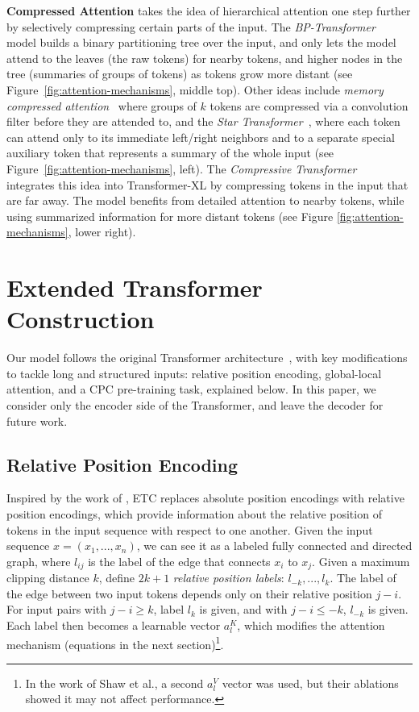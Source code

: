 \documentclass[11pt,a4paper]{article}
\begin{document}
{\bf Compressed Attention} takes the idea of hierarchical attention one step further by selectively compressing certain parts of the input. The {\em BP-Transformer}~\cite{ye2019bp} model builds a binary partitioning tree over the input, and only lets the model attend to the leaves (the raw tokens) for nearby tokens, and higher nodes in the tree (summaries of groups of tokens) as tokens grow more distant (see Figure~\ref{fig:attention-mechanisms}, middle top). Other ideas include {\em memory compressed attention}~\cite{liu2018generating} where groups of $k$ tokens are compressed via a convolution filter before they are attended to, and the {\em Star Transformer}~\cite{guo2019star}, where each token can attend only to its immediate left/right neighbors and to a separate special auxiliary token that represents a summary of the whole input (see Figure~\ref{fig:attention-mechanisms}, left).
The {\em Compressive Transformer}~\cite{rae2019compressive} integrates this idea into Transformer-XL by compressing tokens in the input that are far away. The model benefits from detailed attention to nearby tokens, while using summarized information for more distant tokens (see Figure \ref{fig:attention-mechanisms}, lower right). 







\section{Extended Transformer Construction}\label{sec:etc}

Our model follows the original Transformer architecture~\cite{vaswani2017attention}, with key modifications to tackle long and structured inputs: relative position encoding, global-local attention, and a CPC pre-training task, explained below. In this paper, we consider only the encoder side of the Transformer, and leave the decoder for future work.




\subsection{Relative Position Encoding}\label{sec:relativepe}

Inspired by the work of \citet{shaw2018self}, ETC replaces absolute position encodings with relative position encodings, which provide information about the relative position of tokens in the input sequence with respect to one another. Given the input sequence $x = (x_1, ..., x_n)$, we can see it as a labeled fully connected and directed graph, where $l_{ij}$ is the label of the edge that connects $x_i$ to $x_j$. Given a maximum clipping distance $k$, \citeauthor{shaw2018self} define $2k+1$ {\em relative position labels}: $l_{-k}, ..., l_{k}$. The label of the edge between two input tokens depends only on their relative position $j-i$. For input pairs with $j-i \geq k$, label $l_k$ is given, and with $j-i \leq -k$, $l_{-k}$ is given. Each label then becomes a learnable vector $a_l^K$, which modifies the attention mechanism (equations in the next section)\footnote{In the work of Shaw et al., a second $a_l^V$ vector was used, but their ablations showed it may not affect performance.}.
\end{document}
